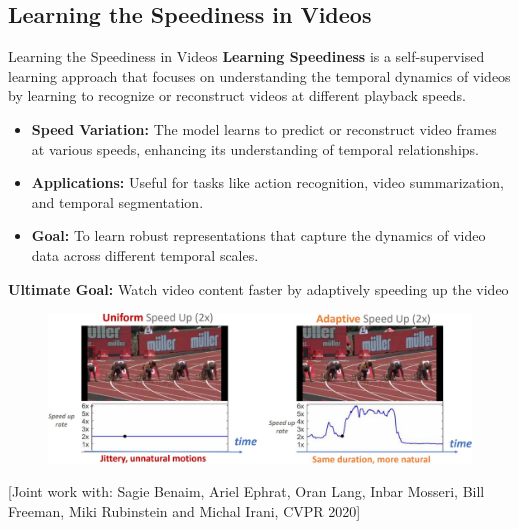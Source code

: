 \subsection{Learning the Speediness in Videos}
\begin{frame}[allowframebreaks]{Learning the Speediness in Videos}
    \textbf{Learning Speediness} is a self-supervised learning approach that focuses on understanding the temporal dynamics of videos by learning to recognize or reconstruct videos at different playback speeds.

    \begin{itemize}
        \item \textbf{Speed Variation:} The model learns to predict or reconstruct video frames at various speeds, enhancing its understanding of temporal relationships.
        \item \textbf{Applications:} Useful for tasks like action recognition, video summarization, and temporal segmentation.
        \item \textbf{Goal:} To learn robust representations that capture the dynamics of video data across different temporal scales.
    \end{itemize}
\framebreak
    \textbf{Ultimate Goal:} Watch video content faster by adaptively speeding up the video
    \begin{figure}
        \centering
        \includegraphics[width=1\textwidth,height=0.7\textheight,keepaspectratio]{images/video/slide_49_1_img.jpg}
    \end{figure}
    \footnotesize{[Joint work with: Sagie Benaim, Ariel Ephrat, Oran Lang, Inbar Mosseri, Bill Freeman, Miki Rubinstein and Michal Irani, CVPR 2020]}
\end{frame}